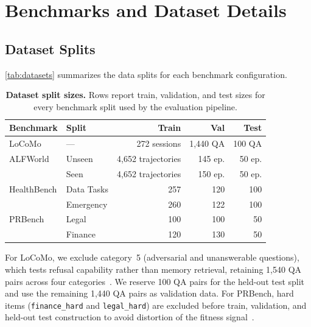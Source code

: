 \FloatBarrier

\section{Benchmarks and Dataset Details}
\label{app:datasets}

\subsection{Dataset Splits}
\label{app:dataset-splits}

\autoref{tab:datasets} summarizes the data splits for each benchmark configuration.

\begin{table}[!htbp]
\centering
\caption{\textbf{Dataset split sizes.}
Rows report train, validation, and test sizes for every benchmark split used by the evaluation pipeline.}
\label{tab:datasets}
\small
\begin{tabular}{@{}llrrr@{}}
\toprule
\textbf{Benchmark} & \textbf{Split} & \textbf{Train} & \textbf{Val} & \textbf{Test} \\
\midrule
LoCoMo         & ---               & 272 sessions  & 1{,}440 QA & 100 QA \\
\midrule
ALFWorld       & Unseen            & 4{,}652 trajectories & 145 ep.    & 50 ep. \\
               & Seen              & 4{,}652 trajectories & 150 ep.    & 50 ep. \\
\midrule
HealthBench    & Data Tasks        & 257           & 120        & 100 \\
               & Emergency         & 260           & 122        & 100 \\
\midrule
PRBench        & Legal             & 100           & 100        & 50 \\
               & Finance           & 120           & 130        & 50 \\
\bottomrule
\end{tabular}
\end{table}

For LoCoMo, we exclude category~5 (adversarial and unanswerable questions), which tests refusal capability rather than memory retrieval, retaining 1{,}540 QA pairs across four categories~\citep{locomo}.
We reserve 100 QA pairs for the held-out test split and use the remaining 1{,}440 QA pairs as validation data.
For PRBench, hard items (\texttt{finance\_hard} and \texttt{legal\_hard}) are excluded before train, validation, and held-out test construction to avoid distortion of the fitness signal~\citep{prbench}.

